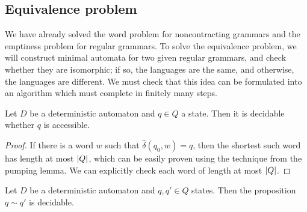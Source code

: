 \subsection{Equivalence problem}
We have already solved the word problem for noncontracting grammars and the emptiness problem for regular grammars.
To solve the equivalence problem, we will construct minimal automata for two given regular grammars, and check whether they are isomorphic; if so, the languages are the same, and otherwise, the languages are different.
We must check that this idea can be formulated into an algorithm which must complete in finitely many steps.
\begin{proposition}
	Let \( D \) be a deterministic automaton and \( q \in Q \) a state.
	Then it is decidable whether \( q \) is accessible.
\end{proposition}
\begin{proof}
	If there is a word \( w \) such that \( \hat\delta(q_0,w) = q \), then the shortest such word has length at most \( \abs{Q} \), which can be easily proven using the technique from the pumping lemma.
	We can explicitly check each word of length at most \( \abs{Q} \).
\end{proof}
\begin{theorem}
	Let \( D \) be a deterministic automaton and \( q, q' \in Q \) states.
	Then the proposition \( q \sim q' \) is decidable.
\end{theorem}
